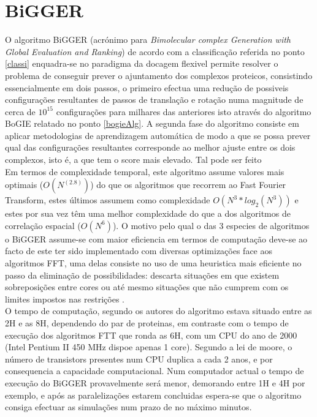 \section{BiGGER}
\label{biggerAlg}
O algoritmo BiGGER (acrónimo para \textit{Bimolecular complex Generation with Global Evaluation and Ranking}) \cite{teseProf} de acordo com a classificação referida no ponto \ref{classi} enquadra-se no paradigma da docagem flexivel\cite{biggerPaper}
 permite resolver o problema de conseguir prever o ajuntamento dos complexos proteicos, 
consistindo essencialmente em dois passos, o primeiro efectua uma redução de possiveis configurações resultantes de passos de translação e rotação numa magnitude de cerca de $10^{15}$ configurações para milhares das anteriores isto através do algoritmo BoGIE relatado no ponto \ref{bogieAlg}. A segunda fase do algoritmo consiste em aplicar metodologias de aprendizagem automática de modo a que se possa prever qual das configurações resultantes corresponde ao melhor ajuste entre os dois complexos, isto é, a que tem o score mais elevado. Tal pode ser feito\\
Em termos de complexidade temporal, este algoritmo assume valores mais optimais ($O(N^(2.8))$\cite{biggerPaper}) do que os algoritmos que recorrem ao Fast Fourier Transform, estes últimos assumem como complexidade $O(N^{3}*log_2(N^{3}))$\cite{teseProf} e estes por sua vez têm uma melhor complexidade do que a dos algoritmos de correlação espacial ($O(N^6)$). O motivo pelo qual o das 3 especies de algoritmos o BiGGER assume-se com maior eficiencia em termos de computação deve-se ao facto de este ter sido implementado com diversas optimizações face aos algoritmos FFT, uma delas consiste no uso de uma heuristica mais eficiente no passo da eliminação de possibilidades: descarta situações em que existem sobreposições entre cores ou até mesmo situações que não cumprem com os limites impostos nas restrições \cite{biggerPaper}. \\
O tempo de computação, segundo os autores do algoritmo estava situado entre as 2H e as 8H, dependendo do par de proteinas, em contraste com o tempo de execução dos algoritmos FTT que ronda as 6H, com um CPU do ano de 2000 (Intel Pentium II 450 MHz dispoe apenas 1 core)\cite{biggerPaper}. Segundo a lei de moore, o número de transistors presentes num CPU duplica a cada 2 anos, e por consequencia a capacidade computacional. Num computador actual o tempo de execução do BiGGER provavelmente será menor, demorando entre 1H e 4H por exemplo, e após as paralelizações estarem concluidas espera-se que o algoritmo consiga efectuar as simulações num prazo de no máximo minutos.\\



